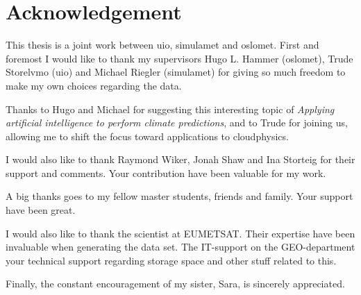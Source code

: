 \chapter*{Acknowledgement}
This thesis is a joint work between \acrfull{uio}, \acrfull{simulamet} and \acrfull{oslomet}. First and foremost I would like to thank my supervisors Hugo L. Hammer (\acrshort{oslomet}), Trude Storelvmo (\acrshort{uio}) and Michael Riegler (\acrshort{simulamet}) for giving so much freedom to make my own choices regarding the data.

Thanks to Hugo and Michael for suggesting this interesting topic of \textit{Applying artificial intelligence to perform climate predictions}, and to Trude for joining us, allowing me to shift the focus toward applications to cloudphysics.

I would also like to thank Raymond Wiker, Jonah Shaw and Ina Storteig for their support and comments. Your contribution have been valuable for my work.

A big thanks goes to my fellow master students, friends and family. Your support have been great.
 
I would also like to thank the scientist at EUMETSAT. 
Their expertise have been invaluable when generating the data set. 
The IT-support on the GEO-department your technical support regarding storage space and other stuff related to this. 

Finally, the constant encouragement of my sister, Sara, is sincerely appreciated.
\cleardoublepage
